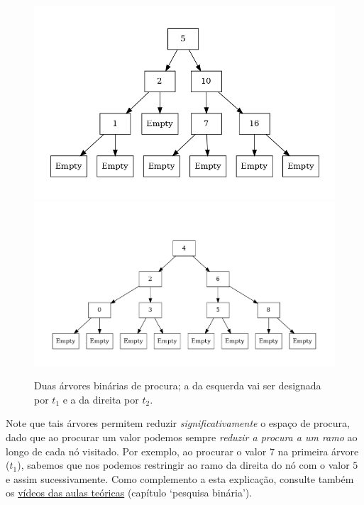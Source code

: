 \documentclass[a4paper]{article}
\begin{document}
    \begin{figure}          
    \includegraphics[scale=0.26]{images/example1.png}
    \includegraphics[scale=0.26]{images/example2.png}
    \caption{Duas árvores binárias de procura; a da esquerda vai ser designada
    por $t_1$ e a da direita por $t_2$.}
    \label{fig:ex}          
    \end{figure}
  Note que tais árvores permitem reduzir \emph{significativamente}
  o espaço de procura, dado que ao procurar um valor podemos sempre
  \emph{reduzir a procura a um ramo} ao longo de cada nó visitado. Por
  exemplo, ao procurar o valor $7$ na primeira árvore ($t_1$), sabemos que nos
  podemos restringir ao ramo da direita do nó com o valor $5$ e assim
  sucessivamente. Como complemento a esta explicação, consulte
  também os \href{http://www4.di.uminho.pt/~jno/media/}{vídeos das aulas teóricas} (capítulo `pesquisa binária').
\end{document}
